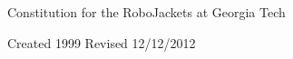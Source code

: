 \documentclass[11pt]{article}
\begin{document}
\begin{center}
\begin{Huge}
Constitution for the RoboJackets at Georgia Tech
\end{Huge}

Created 1999
Revised 12/12/2012

\end{center}
\end{document}
